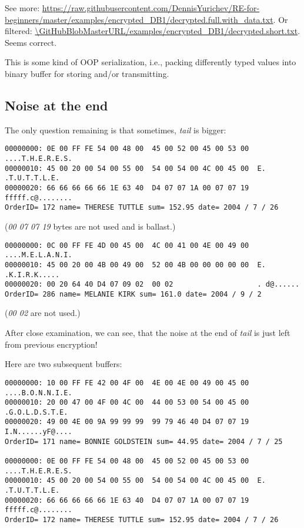 See more: \url{https://raw.githubusercontent.com/DennisYurichev/RE-for-beginners/master/examples/encrypted_DB1/decrypted.full.with_data.txt}.
Or filtered: \url{\GitHubBlobMasterURL/examples/encrypted_DB1/decrypted.short.txt}.
Seems correct.

This is some kind of \ac{OOP} serialization, i.e., packing differently typed values into binary buffer for storing and/or transmitting.

\subsection{Noise at the end}

The only question remaining is that sometimes, \emph{tail} is bigger:

\begin{lstlisting}
00000000: 0E 00 FF FE 54 00 48 00  45 00 52 00 45 00 53 00  ....T.H.E.R.E.S.
00000010: 45 00 20 00 54 00 55 00  54 00 54 00 4C 00 45 00  E. .T.U.T.T.L.E.
00000020: 66 66 66 66 66 1E 63 40  D4 07 07 1A 00 07 07 19  fffff.c@........
OrderID= 172 name= THERESE TUTTLE sum= 152.95 date= 2004 / 7 / 26
\end{lstlisting}

(\emph{00 07 07 19} bytes are not used and is ballast.)

\begin{lstlisting}
00000000: 0C 00 FF FE 4D 00 45 00  4C 00 41 00 4E 00 49 00  ....M.E.L.A.N.I.
00000010: 45 00 20 00 4B 00 49 00  52 00 4B 00 00 00 00 00  E. .K.I.R.K.....
00000020: 00 20 64 40 D4 07 09 02  00 02                    . d@......
OrderID= 286 name= MELANIE KIRK sum= 161.0 date= 2004 / 9 / 2
\end{lstlisting}

(\emph{00 02} are not used.)

After close examination, we can see, that the noise at the end of \emph{tail} is just left
from previous encryption!

Here are two subsequent buffers:

\begin{lstlisting}
00000000: 10 00 FF FE 42 00 4F 00  4E 00 4E 00 49 00 45 00  ....B.O.N.N.I.E.
00000010: 20 00 47 00 4F 00 4C 00  44 00 53 00 54 00 45 00   .G.O.L.D.S.T.E.
00000020: 49 00 4E 00 9A 99 99 99  99 79 46 40 D4 07 07 19  I.N......yF@....
OrderID= 171 name= BONNIE GOLDSTEIN sum= 44.95 date= 2004 / 7 / 25

00000000: 0E 00 FF FE 54 00 48 00  45 00 52 00 45 00 53 00  ....T.H.E.R.E.S.
00000010: 45 00 20 00 54 00 55 00  54 00 54 00 4C 00 45 00  E. .T.U.T.T.L.E.
00000020: 66 66 66 66 66 1E 63 40  D4 07 07 1A 00 07 07 19  fffff.c@........
OrderID= 172 name= THERESE TUTTLE sum= 152.95 date= 2004 / 7 / 26
\end{lstlisting}

